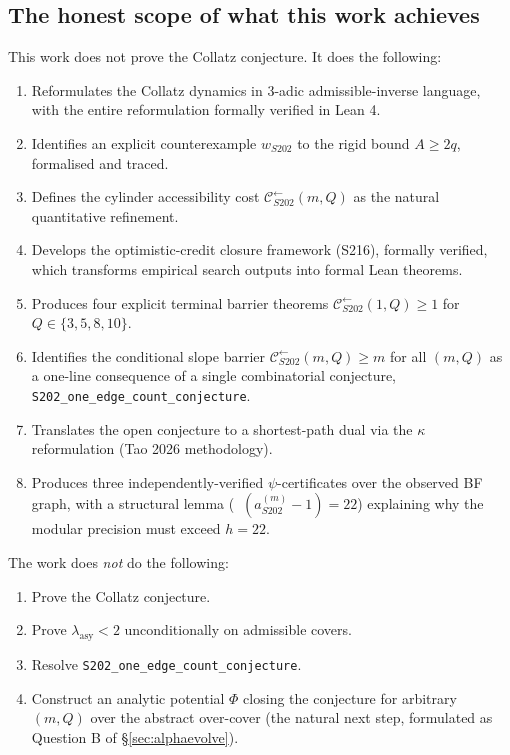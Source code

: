 \documentclass[11pt,a4paper]{article}
\theoremstyle{plain}
\theoremstyle{definition}
\newcommand{\aSat}{a_{S202}^{(m)}}
\newcommand{\wS}{w_{S202}}
\newcommand{\Cback}{\mathcal{C}^{\!\leftarrow}_{S202}}
\DeclareMathOperator{\nuthree}{\nu_3}
\begin{document}
\subsection*{The honest scope of what this work achieves}

This work does not prove the Collatz conjecture. It does the
following:

\begin{enumerate}
   \item Reformulates the Collatz dynamics in 3-adic
         admissible-inverse language, with the entire
         reformulation formally verified in Lean 4.
   \item Identifies an explicit counterexample $\wS$ to the
         rigid bound $A \ge 2q$, formalised and traced.
   \item Defines the cylinder accessibility cost
         $\Cback(m, Q)$ as the natural quantitative refinement.
   \item Develops the optimistic-credit closure framework (S216),
         formally verified, which transforms empirical search
         outputs into formal Lean theorems.
   \item Produces four explicit terminal barrier theorems
         $\Cback(1, Q) \ge 1$ for $Q \in \{3, 5, 8, 10\}$.
   \item Identifies the conditional slope barrier
         $\Cback(m, Q) \ge m$ for all $(m, Q)$ as a one-line
         consequence of a single combinatorial conjecture,
         \texttt{S202\_one\_edge\_count\_conjecture}.
   \item Translates the open conjecture to a shortest-path
         dual via the $\kappa$ reformulation
         (Tao 2026 methodology).
   \item Produces three independently-verified $\psi$-certificates
         over the observed BF graph, with a structural lemma
         ($\nuthree(\aSat - 1) = 22$) explaining why the modular
         precision must exceed $h = 22$.
\end{enumerate}

The work does \emph{not} do the following:

\begin{enumerate}
   \item Prove the Collatz conjecture.
   \item Prove $\lambda_{\mathrm{asy}} < 2$ unconditionally on
         admissible covers.
   \item Resolve \texttt{S202\_one\_edge\_count\_conjecture}.
   \item Construct an analytic potential $\Phi$ closing the
         conjecture for arbitrary $(m, Q)$ over the abstract
         over-cover (the natural next step, formulated as
         Question B of \S\ref{sec:alphaevolve}).
\end{enumerate}
\end{document}
